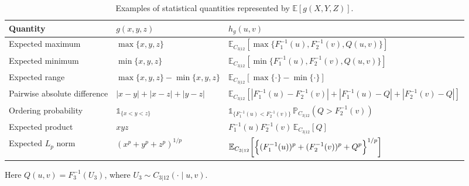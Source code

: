 \documentclass[12pt]{article}
\begin{document}
\begin{table}[H]
	\centering
	\caption{Examples of statistical quantities represented by
		$\mathbb E[g(X,Y,Z)]$.}
	\renewcommand{\arraystretch}{1.2}
	\begin{tabular}{p{2.5cm}p{4.0cm}p{9.0cm}}
		\hline
		Quantity & $g(x,y,z)$ & $h_g(u,v)$\\[1mm]
		\hline
		
		Expected maximum
		&
		$\max\{x,y,z\}$
		&
		$\displaystyle
		\mathbb E_{C_{3|12}}
		\!\left[
		\max\{F_1^{-1}(u),F_2^{-1}(v),Q(u,v)\}
		\right]
		$
		\\
		
		Expected minimum
		&
		$\min\{x,y,z\}$
		&
		$\displaystyle
		\mathbb E_{C_{3|12}}
		\!\left[
		\min\{F_1^{-1}(u),F_2^{-1}(v),Q(u,v)\}
		\right]
		$
		\\
		
		Expected range
		&
		$\max\{x,y,z\}-\min\{x,y,z\}$
		&
		$\displaystyle
		\mathbb E_{C_{3|12}}
		\!\left[
		\max\{\cdot\}-\min\{\cdot\}
		\right]
		$
		\\
		
		Pairwise absolute difference
		&
		$|x-y|+|x-z|+|y-z|$
		&
		$\displaystyle
		\mathbb E_{C_{3|12}}
		\!\left[
		|F_1^{-1}(u)-F_2^{-1}(v)|
		+
		|F_1^{-1}(u)-Q|
		+
		|F_2^{-1}(v)-Q|
		\right]
		$
		\\
		
		Ordering probability
		&
		$\mathds{1}_{\{x<y<z\}}$
		&
		$\displaystyle
		\mathds{1}_{\{F_1^{-1}(u)<F_2^{-1}(v)\}}
		\,\mathbb{P}_{C_{3|12}}
		\!\left(
		Q>F_2^{-1}(v)
		\right)
		$
		\\
		
		Expected product
		&
		$xyz$
		&
		$\displaystyle
		F_1^{-1}(u)F_2^{-1}(v)
		\,
		\mathbb E_{C_{3|12}}[Q]
		$
		\\
		
		Expected $L_p$ norm
		&
		$\left(x^p+y^p+z^p\right)^{1/p}$
		&
		$\displaystyle
		\mathbb E_{C_{3|12}}
		\!\left[
		\Bigl\{
		(F_1^{-1}(u))^p
		+(F_2^{-1}(v))^p
		+Q^p
		\Bigr\}^{1/p}
		\right]
		$
		\\
		
		\hline
	\end{tabular}
	
	\vspace{0.2cm}
	
	{\footnotesize
		Here
		$Q(u,v)=F_3^{-1}(U_3)$,
		where
		$U_3\sim C_{3|12}(\cdot\mid u,v)$.
	}
	\label{Table-5}
\end{table}
\end{document}
